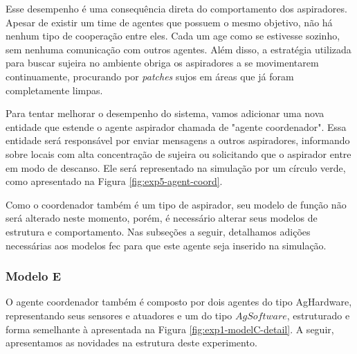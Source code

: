 Esse desempenho é uma consequência direta do comportamento dos aspiradores. Apesar de existir um time de agentes que possuem o mesmo objetivo, não há nenhum tipo de cooperação entre eles. Cada um age como se estivesse sozinho, sem nenhuma comunicação com outros agentes. Além disso, a estratégia utilizada para buscar sujeira no ambiente obriga os aspiradores a se movimentarem continuamente, procurando por \textit{patches} sujos em áreas que já foram completamente limpas. 

Para tentar melhorar o desempenho do sistema, vamos adicionar uma nova entidade que estende o agente aspirador chamada de "agente coordenador". Essa entidade será responsável por enviar mensagens a outros aspiradores, informando sobre locais com alta concentração de sujeira ou solicitando que o aspirador entre em modo de descanso. Ele será representado na simulação por um círculo verde, como apresentado na Figura \ref{fig:exp5-agent-coord}.

\begin{figure}[h!]
    \centering
\end{figure}

Como o coordenador também é um tipo de aspirador, seu modelo de função não será alterado neste momento, porém, é necessário alterar seus modelos de estrutura e comportamento. Nas subseções a seguir, detalhamos adições necessárias aos modelos \acrshort{fec} para que este agente seja inserido na simulação.  

\subsubsection{Modelo E}

O agente coordenador também é composto por dois agentes do tipo AgHardware, representando seus sensores e atuadores e um do tipo $AgSoftware$, estruturado e forma semelhante à apresentada na Figura \ref{fig:exp1-modelC-detail}. A seguir, apresentamos as novidades na estrutura deste experimento. 

